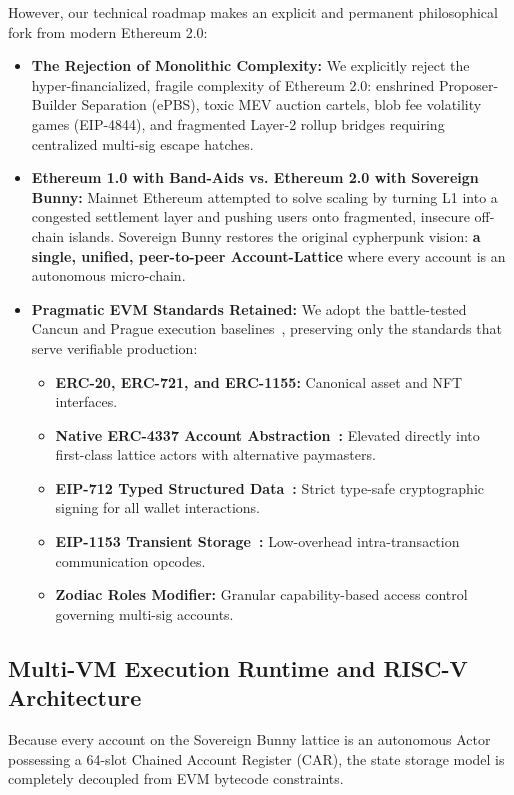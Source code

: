 \documentclass[a4paper,11pt,twoside,parskip=half-,headings=small]{scrartcl}
\begin{document}
However, our technical roadmap makes an explicit and permanent philosophical fork from modern Ethereum 2.0:
\begin{itemize}
  \item \textbf{The Rejection of Monolithic Complexity:} We explicitly reject the hyper-financialized, fragile complexity of Ethereum 2.0: enshrined Proposer-Builder Separation (ePBS), toxic MEV auction cartels, blob fee volatility games (EIP-4844), and fragmented Layer-2 rollup bridges requiring centralized multi-sig escape hatches.
  \item \textbf{Ethereum 1.0 with Band-Aids vs. Ethereum 2.0 with Sovereign Bunny:} Mainnet Ethereum attempted to solve scaling by turning L1 into a congested settlement layer and pushing users onto fragmented, insecure off-chain islands. Sovereign Bunny restores the original cypherpunk vision: \textbf{a single, unified, peer-to-peer Account-Lattice} where every account is an autonomous micro-chain.
  \item \textbf{Pragmatic EVM Standards Retained:} We adopt the battle-tested Cancun and Prague execution baselines~\cite{ethereumspeccancun}, preserving only the standards that serve verifiable production:
  \begin{itemize}
    \item \textbf{ERC-20, ERC-721, and ERC-1155:} Canonical asset and NFT interfaces.
    \item \textbf{Native ERC-4337 Account Abstraction~\cite{eip4337}:} Elevated directly into first-class lattice actors with alternative paymasters.
    \item \textbf{EIP-712 Typed Structured Data~\cite{eip712}:} Strict type-safe cryptographic signing for all wallet interactions.
    \item \textbf{EIP-1153 Transient Storage~\cite{eip1153}:} Low-overhead intra-transaction communication opcodes.
    \item \textbf{Zodiac Roles Modifier:} Granular capability-based access control governing multi-sig accounts.
  \end{itemize}
\end{itemize}

\subsection{Multi-VM Execution Runtime and RISC-V Architecture}
\label{sec:riscv_multivm}

Because every account on the Sovereign Bunny lattice is an autonomous Actor possessing a 64-slot Chained Account Register (CAR),
the state storage model is completely decoupled from EVM bytecode constraints.
\end{document}
